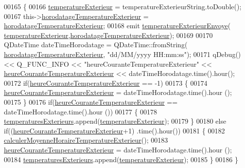 \begin{DoxyCode}
00165 \{
00166     \hyperlink{class_infos_temperature_af80286a5b0e05d0379f53c0ebbc7d483}{temperatureExterieur} = temperatureExterieurString.toDouble();
00167     this->\hyperlink{class_infos_temperature_a5c3cd364746dc1cae5f9faee55c7555e}{horodatageTemperatureExterieur} = 
      \hyperlink{class_infos_temperature_a5c3cd364746dc1cae5f9faee55c7555e}{horodatageTemperatureExterieur};
00168     emit \hyperlink{class_infos_temperature_a6fbc9ab43714a5ba6649648c15989dee}{temperatureExterieurEnvoye}(
      \hyperlink{class_infos_temperature_af80286a5b0e05d0379f53c0ebbc7d483}{temperatureExterieur},\hyperlink{class_infos_temperature_a5c3cd364746dc1cae5f9faee55c7555e}{horodatageTemperatureExterieur});
00169 
00170     QDateTime dateTimeHorodatage = QDateTime::fromString(
      \hyperlink{class_infos_temperature_a5c3cd364746dc1cae5f9faee55c7555e}{horodatageTemperatureExterieur}, \textcolor{stringliteral}{"dd/MM/yyyy HH:mm:ss"});
00171     qDebug() << Q\_FUNC\_INFO << \textcolor{stringliteral}{"heureCouranteTemperatureExterieur"} << 
      \hyperlink{class_infos_temperature_a44edcf244175896e28798f252900f774}{heureCouranteTemperatureExterieur} << dateTimeHorodatage.time().hour();
00172     \textcolor{keywordflow}{if}(\hyperlink{class_infos_temperature_a44edcf244175896e28798f252900f774}{heureCouranteTemperatureExterieur} == -1)
00173     \{
00174         \hyperlink{class_infos_temperature_a44edcf244175896e28798f252900f774}{heureCouranteTemperatureExterieur} = dateTimeHorodatage.time().hour
      ();
00175     \}
00176     \textcolor{keywordflow}{if}(\hyperlink{class_infos_temperature_a44edcf244175896e28798f252900f774}{heureCouranteTemperatureExterieur} == dateTimeHorodatage.time().hour
      ())
00177     \{
00178         \hyperlink{class_infos_temperature_a32b2a36e737ab4bf61fc8274990c2943}{temperaturesExterieurs}.append(\hyperlink{class_infos_temperature_af80286a5b0e05d0379f53c0ebbc7d483}{temperatureExterieur});
00179     \}
00180     \textcolor{keywordflow}{else} \textcolor{keywordflow}{if}((\hyperlink{class_infos_temperature_a44edcf244175896e28798f252900f774}{heureCouranteTemperatureExterieur}+1)%
      .time().hour())
00181     \{
00182         \hyperlink{class_infos_temperature_a437325028225d765780b884614c47077}{calculerMoyenneHoraireTemperatureExterieur}();
00183         \hyperlink{class_infos_temperature_a44edcf244175896e28798f252900f774}{heureCouranteTemperatureExterieur} = dateTimeHorodatage.time().hour
      ();
00184         \hyperlink{class_infos_temperature_a32b2a36e737ab4bf61fc8274990c2943}{temperaturesExterieurs}.append(\hyperlink{class_infos_temperature_af80286a5b0e05d0379f53c0ebbc7d483}{temperatureExterieur});
00185     \}
00186 \}
\end{DoxyCode}
\mbox{\label{class_infos_temperature_a547da18a7c04603d2f30eece061d9634}} 
